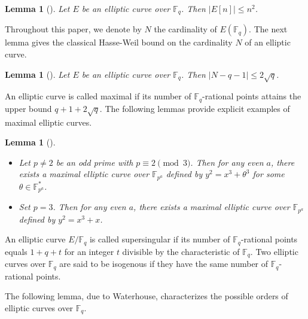 \documentclass[journal,12pt,onecolumn]{IEEEtran}
\newtheorem{lemma}[theorem]{Lemma}
\begin{document}
\begin{lemma}[{\cite[Chapter III, \S 6]{MR2514094}}]\label{lem:bound_on_torsion}
Let $E$ be an elliptic curve over $\mathbb{F}_q$. Then $|E[n]| \le n^2$.
\end{lemma}

Throughout this paper, we denote by $ N $ the cardinality of $ E(\mathbb{F}_q) $. 
The next lemma gives the classical Hasse-Weil bound on the cardinality $N$ of an elliptic curve.

\begin{lemma}[{\cite[Theorem 5.2.3]{MR2464941}}]\label{lem:the_bound_of_rational_number}
 Let $E$ be an elliptic curve over $\mathbb{F}_q$. Then $\bigl| N - q - 1 \bigr| \le 2\sqrt{q}$.
\end{lemma}
An elliptic curve is called maximal if its number of $\mathbb{F}_q$-rational points attains the upper bound $q + 1 + 2\sqrt{q}$.
The following lemmas provide explicit examples of maximal elliptic curves.
\begin{lemma}[\cite{MR3900980}]\label{lem:maximalcurveforp=2mod3}

\begin{itemize}
    \item[(i)] Let $p \neq 2$ be an odd prime with $p \equiv 2 \pmod{3}$. Then for any even $a$, there exists a maximal elliptic curve over $\mathbb{F}_{p^a}$ defined by $y^2 = x^3 + \theta^3$ for some $\theta \in \mathbb{F}_{p^a}^*$.
    \item[(ii)] Set $p = 3$. Then for any even $a$, there exists a maximal elliptic curve over $\mathbb{F}_{p^a}$ defined by $y^2 = x^3 + x$.
\end{itemize}
\end{lemma}

An elliptic curve $E/\mathbb{F}_q$ is called supersingular if its number of $\mathbb{F}_q$-rational points equals $1 + q + t$ for an integer $t$ divisible by the characteristic of $\mathbb{F}_q$. Two elliptic curves over $\mathbb{F}_q$ are said to be isogenous if they have the same number of $\mathbb{F}_q$-rational points.

The following lemma, due to Waterhouse, characterizes the possible orders of elliptic curves over $\mathbb{F}_q$.
\end{document}
